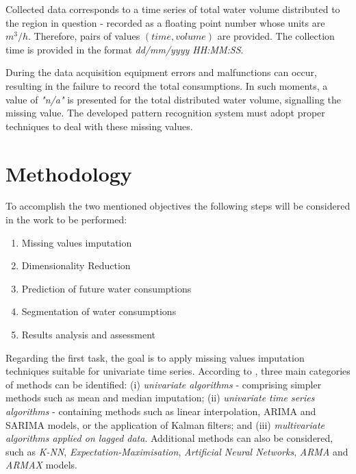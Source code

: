 \documentclass[11pt]{article}
\begin{document}
Collected data corresponds to a time series of total water volume distributed to the region in question - recorded as a floating point number whose units are $m^{3}/h$. Therefore, pairs of values $(time, volume)$ are provided. The collection time is provided in the format \emph{dd/mm/yyyy HH:MM:SS}.

During the data acquisition equipment errors and malfunctions can occur, resulting in the failure to record the total consumptions. In such moments, a value of \emph{"n/a"} is presented for the total distributed water volume, signalling the missing value. The developed pattern recognition system must adopt proper techniques to deal with these missing values.

\section{Methodology}
\label{methodology}

To accomplish the two mentioned objectives the following steps will be considered in the work to be performed:

\begin{enumerate}
	\item Missing values imputation
	
	\item Dimensionality Reduction
	
	\item Prediction of future water consumptions
	
	\item Segmentation of water consumptions
	
	\item Results analysis and assessment
\end{enumerate}

Regarding the first task, the goal is to apply missing values imputation techniques suitable for univariate time series. According to \cite{moritz2015comparison}, three main categories of methods can be identified: (i) \emph{univariate algorithms} - comprising simpler methods such as mean and median imputation; (ii) \emph{univariate time series algorithms} - containing methods such as linear interpolation, ARIMA and SARIMA models, or the application of Kalman filters; and (iii) \emph{multivariate algorithms applied on lagged data}. Additional methods can also be considered, such as \emph{K-NN}, \emph{Expectation-Maximisation}, \emph{Artificial Neural Networks}, \emph{ARMA} and \emph{ARMAX} models.
\end{document}
